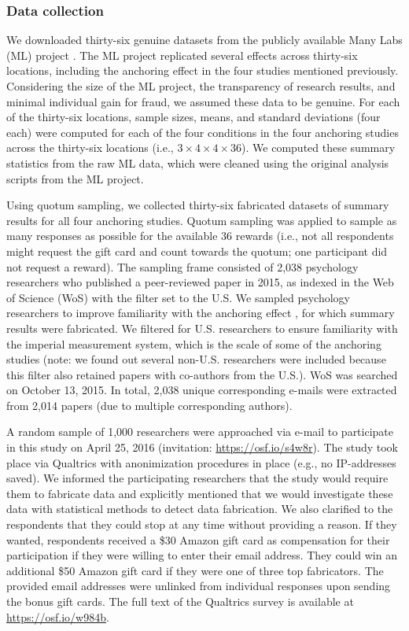 \documentclass{article}
\begin{document}
\subsubsection*{Data collection}

We downloaded thirty-six genuine datasets from the publicly available Many Labs (ML) project \citep[\url{https://osf.io/pqf9r};][]{klein2014}. The ML project replicated several effects across thirty-six locations, including the anchoring effect in the four studies mentioned previously. Considering the size of the ML project, the transparency of research results, and minimal individual gain for fraud, we assumed these data to be genuine. For each of the thirty-six locations, sample sizes, means, and standard deviations (four each) were computed for each of the four conditions in the four anchoring studies across the thirty-six locations (i.e., $3\times4\times4\times36$). We computed these summary statistics from the raw ML data, which were cleaned using the original analysis scripts from the ML project.

Using quotum sampling, we collected thirty-six fabricated datasets of summary results for all four anchoring studies. Quotum sampling was applied to sample as many responses as possible for the available 36 rewards (i.e., not all respondents might request the gift card and count towards the quotum; one participant did not request a reward). The sampling frame consisted of 2,038 psychology researchers who published a peer-reviewed paper in 2015, as indexed in the Web of Science (WoS) with the filter set to the U.S. We sampled psychology researchers to improve familiarity with the anchoring effect \citep{jacowitz1995,tversky1974}, for which summary results were fabricated. We filtered for U.S. researchers to ensure familiarity with the imperial measurement system, which is the scale of some of the anchoring studies (note: we found out several non-U.S. researchers were included because this filter also retained papers with co-authors from the U.S.). WoS was searched on October 13, 2015. In total, 2,038 unique corresponding e-mails were extracted from 2,014 papers (due to multiple corresponding authors).

A random sample of 1,000 researchers were approached via e-mail to participate in this study on April 25, 2016 (invitation: \url{https://osf.io/s4w8r}). The study took place via Qualtrics with anonimization procedures in place (e.g., no IP-addresses saved). We informed the participating researchers that the study would require them to fabricate data and explicitly mentioned that we would investigate these data with statistical methods to detect data fabrication. We also clarified to the  respondents that they could stop at any time without providing a reason. If they wanted, respondents received a \$30 Amazon gift card as compensation for their participation if they were willing to enter their email address. They could win an additional \$50 Amazon gift card if they were one of three top fabricators. The provided email addresses were unlinked from individual responses upon sending the bonus gift cards. The full text of the Qualtrics survey is available at \url{https://osf.io/w984b}.
\end{document}
